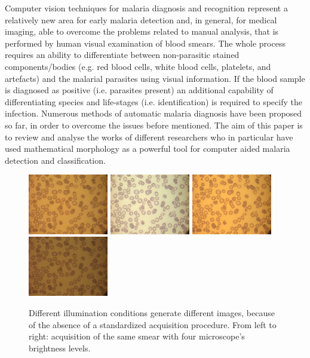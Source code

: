 \documentclass[sensors,review,submit,moreauthors,pdftex,10pt,a4paper]{mdpi}
\begin{document}
Computer vision techniques for malaria diagnosis and recognition represent a relatively new area for early malaria detection and, in general, for medical imaging, able to overcome the problems related to manual analysis, that is performed by human visual examination of blood smears. The whole process requires an ability to differentiate between non-parasitic stained components/bodies (e.g. red blood cells, white blood cells, platelets, and artefacts) and the malarial parasites using visual information. If the blood sample is diagnosed as positive (i.e. parasites present) an additional capability of differentiating species and life-stages (i.e. identification) is required to specify the infection. Numerous methods of automatic malaria diagnosis have been proposed so far, in order to overcome the issues before mentioned. The aim of this paper is to review and analyse the works of different researchers who in particular have used mathematical morphology as a powerful tool for computer aided malaria detection and classification.

\begin{figure}[!t]
	\centering	
	\includegraphics[width=3.5cm]{img/f1a.eps}
	\includegraphics[width=3.5cm]{img/f1b.eps}
	\includegraphics[width=3.5cm]{img/f1c.eps}
	\includegraphics[width=3.5cm]{img/f1d.eps}
	\caption{\label{fig:images_types}Different illumination conditions generate different images, because of the absence of a standardized acquisition procedure. From left to right: acquisition of the same smear with four microscope's brightness levels.}
\end{figure}
\end{document}

